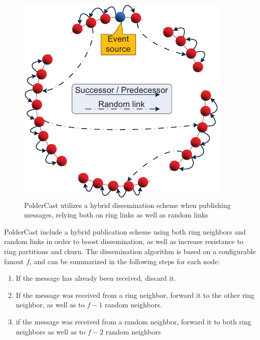 \begin{figure}[h]
    \centering
\includegraphics{img/hybrid_dissemination.pdf}
\caption{PolderCast utilizes a hybrid dissemination scheme when
    publishing messages, relying both on ring links as well as random
    links}
\end{figure}


PolderCast include a hybrid publication scheme using both
ring neighbors and random links in order to boost
dissemination, as well as increase resistance to ring
partitions and churn. The dissemination algorithm is based
on a configurable fanout $f$, and can be summarized in the
following steps for each node:

\begin{enumerate}
    \item If the message has already been received, discard it.
    \item If the message was received from a ring neighbor, forward it
        to the other ring neighbor, as well as to $f-1$ random
        neighbors.
    \item if the message was received from a random neighbor,
        forward it to both ring neighbors as well as to $f-2$ random
        neighbors
\end{enumerate}

